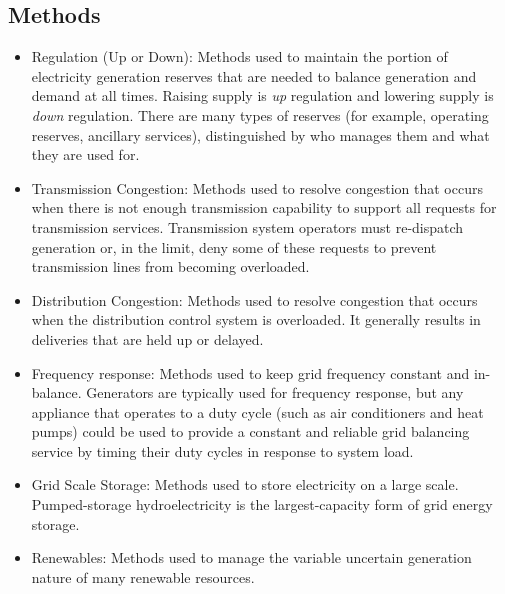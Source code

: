\subsection{Methods}
\begin{itemize}
\item Regulation (Up or Down): Methods used to maintain the portion of electricity generation reserves 
that are needed to balance generation and demand at all times. Raising supply is \emph{up} regulation and lowering 
supply is \emph{down} regulation. There are many types of reserves (for example, operating reserves, ancillary services), distinguished by who manages them and what they are used for.

\item Transmission Congestion: Methods used to resolve congestion that occurs when there is not enough 
transmission capability to support all requests for transmission services. Transmission system operators 
must re-dispatch generation or, 
in the limit, deny some of these requests to prevent transmission lines from becoming overloaded.

\item Distribution Congestion:  Methods used to resolve congestion that occurs when the 
distribution control system 
is overloaded.  It generally results in deliveries that are held up or delayed.  

\item Frequency response:  Methods used to keep grid frequency constant and in-balance. 
Generators are typically used for frequency response, but any appliance that operates to a duty cycle 
(such as air conditioners and heat pumps) could be used to provide a 
constant and reliable grid balancing service by timing their duty cycles in response to system load.   

\item Grid Scale Storage:  Methods used to store electricity on a large scale. 
Pumped-storage hydroelectricity is the largest-capacity form of grid energy storage. 

\item Renewables:  Methods used to manage the variable uncertain generation nature of 
many renewable resources. 
\end{itemize}

